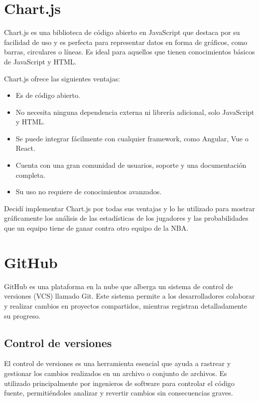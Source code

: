 \clearpage

\section{Chart.js}
Chart.js \cite{chartjs} es una biblioteca de código abierto en JavaScript que destaca por su facilidad de uso y es perfecta para representar datos en forma de gráficos, como barras, circulares o líneas. Es ideal para aquellos que tienen conocimientos básicos de JavaScript y HTML.

Chart.js ofrece las siguientes ventajas:
\begin{itemize}
\tightlist
    \item
        Es de código abierto.
    \item 
        No necesita ninguna dependencia externa ni librería adicional, solo JavaScript y HTML.
    \item 
        Se puede integrar fácilmente con cualquier framework, como Angular, Vue o React.
    \item 
        Cuenta con una gran comunidad de usuarios, soporte y una documentación completa.
    \item 
        Su uso no requiere de conocimientos avanzados.
\end{itemize}

Decidí implementar Chart.js por todas sus ventajas y lo he utilizado para mostrar gráficamente los análisis de las estadísticas de los jugadores y las probabilidades que un equipo tiene de ganar contra otro equipo de la NBA.

\hfill

\section{GitHub}
GitHub \cite{github} es una plataforma en la nube que alberga un sistema de control de versiones (VCS) llamado Git. Este sistema permite a los desarrolladores colaborar y realizar cambios en proyectos compartidos, mientras registran detalladamente su progreso.

\subsection{Control de versiones}
El control de versiones es una herramienta esencial que ayuda a rastrear y gestionar los cambios realizados en un archivo o conjunto de archivos. Es utilizado principalmente por ingenieros de software para controlar el código fuente, permitiéndoles analizar y revertir cambios sin consecuencias graves.

